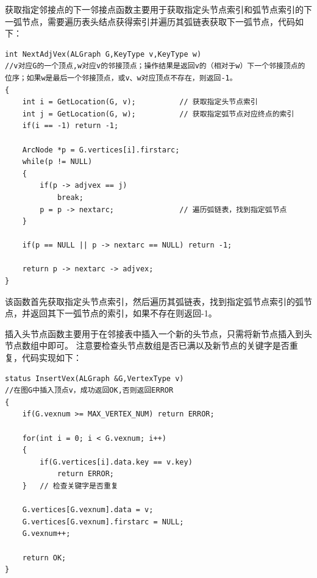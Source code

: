 \documentclass[supercite]{Experimental_Report}
\theoremstyle{definition}
\begin{document}
	获取指定邻接点的下一邻接点函数主要用于获取指定头节点索引和弧节点索引的下一弧节点，需要遍历表头结点获得索引并遍历其弧链表获取下一弧节点，代码如下：
\begin{lstlisting}[caption={获取指定邻接点的下一邻接点}, label=lst:get_next_adjacent_node]
int NextAdjVex(ALGraph G,KeyType v,KeyType w)
//v对应G的一个顶点,w对应v的邻接顶点；操作结果是返回v的（相对于w）下一个邻接顶点的位序；如果w是最后一个邻接顶点，或v、w对应顶点不存在，则返回-1。
{
	int i = GetLocation(G, v);			// 获取指定头节点索引
	int j = GetLocation(G, w);			// 获取指定弧节点对应终点的索引
	if(i == -1) return -1;

	ArcNode *p = G.vertices[i].firstarc;
	while(p != NULL)
	{
		if(p -> adjvex == j)
			break;
		p = p -> nextarc;				// 遍历弧链表，找到指定弧节点
	}

	if(p == NULL || p -> nextarc == NULL) return -1;

	return p -> nextarc -> adjvex;
}
\end{lstlisting}
	该函数首先获取指定头节点索引，然后遍历其弧链表，找到指定弧节点索引的弧节点，并返回其下一弧节点的索引，如果不存在则返回-1。

	插入头节点函数主要用于在邻接表中插入一个新的头节点，只需将新节点插入到头节点数组中即可。
	注意要检查头节点数组是否已满以及新节点的关键字是否重复，代码实现如下：
\begin{lstlisting}[caption={插入头节点}, label=lst:insert_head_node]
status InsertVex(ALGraph &G,VertexType v)
//在图G中插入顶点v，成功返回OK,否则返回ERROR
{
	if(G.vexnum >= MAX_VERTEX_NUM) return ERROR;

	for(int i = 0; i < G.vexnum; i++)
	{
		if(G.vertices[i].data.key == v.key)
			return ERROR;
	}	// 检查关键字是否重复

	G.vertices[G.vexnum].data = v;
	G.vertices[G.vexnum].firstarc = NULL;
	G.vexnum++;

	return OK;
}
\end{lstlisting}
\end{document}
